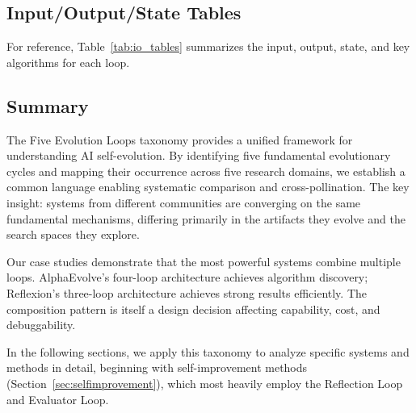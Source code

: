 \subsection{Input/Output/State Tables}

For reference, Table~\ref{tab:io_tables} summarizes the input, output, state, and key algorithms for each loop.

\begin{table}[t]
\centering
\small
\caption{Input/Output/State summary for each evolution loop.}
\label{tab:io_tables}
\end{table}


\subsection{Summary}

The Five Evolution Loops taxonomy provides a unified framework for understanding AI self-evolution. By identifying five fundamental evolutionary cycles and mapping their occurrence across five research domains, we establish a common language enabling systematic comparison and cross-pollination. The key insight: systems from different communities are converging on the same fundamental mechanisms, differing primarily in the artifacts they evolve and the search spaces they explore.

Our case studies demonstrate that the most powerful systems combine multiple loops. AlphaEvolve's four-loop architecture achieves algorithm discovery; Reflexion's three-loop architecture achieves strong results efficiently. The composition pattern is itself a design decision affecting capability, cost, and debuggability.

In the following sections, we apply this taxonomy to analyze specific systems and methods in detail, beginning with self-improvement methods (Section~\ref{sec:selfimprovement}), which most heavily employ the Reflection Loop and Evaluator Loop.
